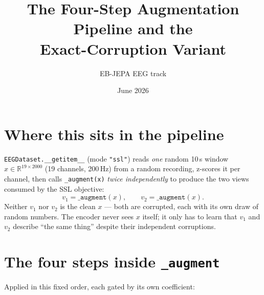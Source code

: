 \documentclass[10pt,a4paper]{article}
\title{\textbf{The Four-Step Augmentation Pipeline and the\\Exact-Corruption Variant}}
\author{EB-JEPA EEG track}
\date{June 2026}
\begin{document}
\maketitle

\section{Where this sits in the pipeline}
\texttt{EEGDataset.\_\_getitem\_\_} (mode \texttt{"ssl"}) reads \emph{one} random
10\,s window $x \in \mathbb{R}^{19 \times 2000}$ (19 channels, 200\,Hz) from a random
recording, z-scores it per channel, then calls \texttt{\_augment(x)} \emph{twice
independently} to produce the two views consumed by the SSL objective:
\[
  v_1 = \texttt{\_augment}(x), \qquad v_2 = \texttt{\_augment}(x).
\]
Neither $v_1$ nor $v_2$ is the clean $x$ — both are corrupted, each with its own draw
of random numbers. The encoder never sees $x$ itself; it only has to learn that $v_1$
and $v_2$ describe ``the same thing'' despite their independent corruptions.

\section{The four steps inside \texttt{\_augment}}
Applied in this fixed order, each gated by its own coefficient:
\end{document}
